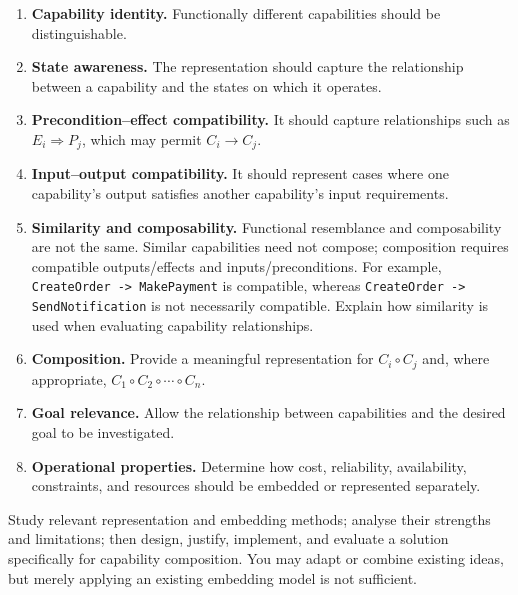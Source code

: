 \documentclass[11pt]{article}
\newcommand{\term}[1]{\textbf{\color{navy}#1}}
\newcommand{\code}[1]{\texttt{#1}}
\begin{document}
\begin{enumerate}[label=\textbf{\arabic*.}]
  \item \term{Capability identity.} Functionally different capabilities should be
  distinguishable.

  \item \term{State awareness.} The representation should capture the relationship between
  a capability and the states on which it operates.

  \item \term{Precondition--effect compatibility.} It should capture relationships such as
  \(E_i\Rightarrow P_j\), which may permit \(C_i\rightarrow C_j\).

  \item \term{Input--output compatibility.} It should represent cases where one
  capability's output satisfies another capability's input requirements.

  \item \term{Similarity and composability.} Functional resemblance and composability are
  not the same. Similar capabilities need not compose; composition requires compatible
  outputs/effects and inputs/preconditions. For example,
  \code{CreateOrder -> MakePayment} is compatible, whereas
  \code{CreateOrder -> SendNotification} is not necessarily compatible. Explain how
  similarity is used when evaluating capability relationships.

  \item \term{Composition.} Provide a meaningful representation for \(C_i\circ C_j\) and,
  where appropriate, \(C_1\circ C_2\circ\cdots\circ C_n\).

  \item \term{Goal relevance.} Allow the relationship between capabilities and the desired
  goal to be investigated.

  \item \term{Operational properties.} Determine how cost, reliability, availability,
  constraints, and resources should be embedded or represented separately.
\end{enumerate}

\clearpage
\begin{keybox}[title={No prescribed embedding technique}]
Study relevant representation and embedding methods;
analyse their strengths and limitations; then design, justify, implement, and evaluate a
solution specifically for capability composition. You may adapt or combine existing ideas,
but merely applying an existing embedding model is not sufficient.
\end{keybox}
\end{document}
